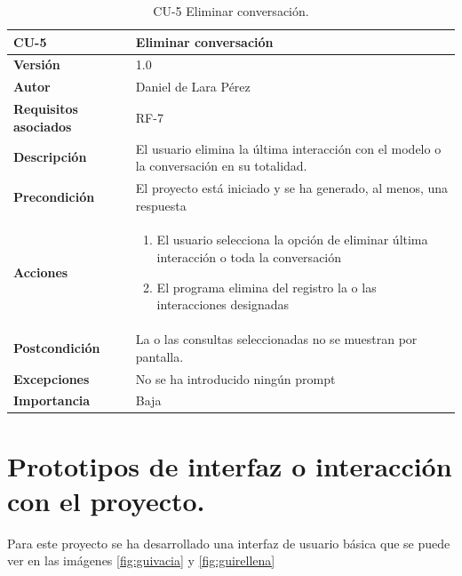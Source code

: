 \begin{table}[p]
	\centering
	\begin{tabularx}{\linewidth}{ p{} p{} }
		\toprule
		\textbf{CU-5}    & \textbf{Eliminar conversación}\\
		\toprule
		\textbf{Versión}              & 1.0    \\
		\textbf{Autor}                & Daniel de Lara Pérez \\
		\textbf{Requisitos asociados} & RF-7 \\
		\textbf{Descripción}          & El usuario elimina la última interacción con el modelo o la conversación en su totalidad. \\
		\textbf{Precondición}         & El proyecto está iniciado y se ha generado, al menos, una respuesta \\
		\textbf{Acciones}             &
		\begin{enumerate}
			\def\labelenumi{\arabic{enumi}.}
			\tightlist
			\item El usuario selecciona la opción de eliminar última interacción o toda la conversación
            \item El programa elimina del registro la o las interacciones designadas
         
		\end{enumerate}\\
		\textbf{Postcondición}        & La o las consultas seleccionadas no se muestran por pantalla. \\
		\textbf{Excepciones}          &  No se ha introducido ningún prompt \\
		\textbf{Importancia}          & Baja\\
		\bottomrule
	\end{tabularx}
	\caption{CU-5 Eliminar conversación.}
\end{table}

\section{Prototipos de interfaz o interacción con el proyecto.}

Para este proyecto se ha desarrollado una interfaz de usuario básica que se puede ver en las imágenes \ref{fig:guivacia} y \ref{fig:guirellena}